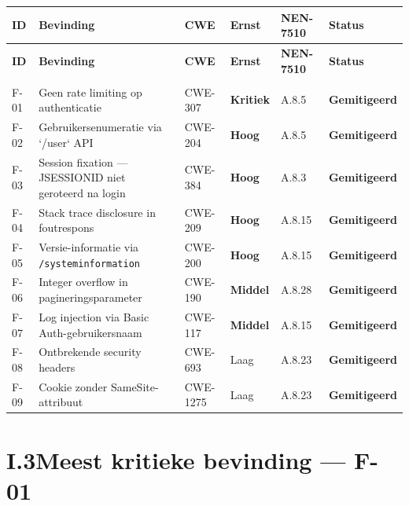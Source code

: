 \documentclass[12pt, a4paper]{report}
\newcommand{\rood}[1]{\textcolor{avansRed}{\textbf{#1}}}
\newcommand{\amber}[1]{\textcolor{ragAmber}{\textbf{#1}}}
\newcommand{\geel}[1]{\textcolor{ragYellow}{\textbf{#1}}}
\newcommand{\groen}[1]{\textcolor{ragGreen}{\textbf{#1}}}
\begin{document}
{\small
\renewcommand{\arraystretch}{1.15}
\begin{longtable}{@{}
    >{\raggedright\arraybackslash}p{0.9cm}
    >{\raggedright\arraybackslash}p{4.7cm}
    >{\raggedright\arraybackslash}p{1.8cm}
    >{\raggedright\arraybackslash}p{1.6cm}
    >{\raggedright\arraybackslash}p{1.8cm}
    >{\raggedright\arraybackslash}p{2.3cm}@{}}
\toprule
\textbf{ID} & \textbf{Bevinding} & \textbf{CWE} &
\textbf{Ernst} & \textbf{NEN-7510} & \textbf{Status} \\
\midrule
\endfirsthead
\toprule
\textbf{ID} & \textbf{Bevinding} & \textbf{CWE} &
\textbf{Ernst} & \textbf{NEN-7510} & \textbf{Status} \\
\midrule
\endhead
\midrule\multicolumn{6}{r}{\emph{vervolgt}}\\\endfoot
\bottomrule\endlastfoot

F-01 & Geen rate limiting op authenticatie &
    CWE-307 & \rood{Kritiek} & A.8.5 & \groen{Gemitigeerd} \\
F-02 & Gebruikersenumeratie via `/user` API &
    CWE-204 & \amber{Hoog} & A.8.5 & \groen{Gemitigeerd} \\
F-03 & Session fixation --- JSESSIONID niet geroteerd na login &
    CWE-384 & \amber{Hoog} & A.8.3 & \groen{Gemitigeerd} \\
F-04 & Stack trace disclosure in foutrespons &
    CWE-209 & \amber{Hoog} & A.8.15 & \groen{Gemitigeerd} \\
F-05 & Versie-informatie via \texttt{/systeminformation} &
    CWE-200 & \amber{Hoog} & A.8.15 & \groen{Gemitigeerd} \\
F-06 & Integer overflow in pagineringsparameter &
    CWE-190 & \geel{Middel} & A.8.28 & \groen{Gemitigeerd} \\
F-07 & Log injection via Basic Auth-gebruikersnaam &
    CWE-117 & \geel{Middel} & A.8.15 & \groen{Gemitigeerd} \\
F-08 & Ontbrekende security headers &
    CWE-693 & Laag & A.8.23 & \groen{Gemitigeerd} \\
F-09 & Cookie zonder SameSite-attribuut &
    CWE-1275 & Laag & A.8.23 & \groen{Gemitigeerd} \\

\end{longtable}
}

\section*{I.3\quad Meest kritieke bevinding --- F-01}
\end{document}
